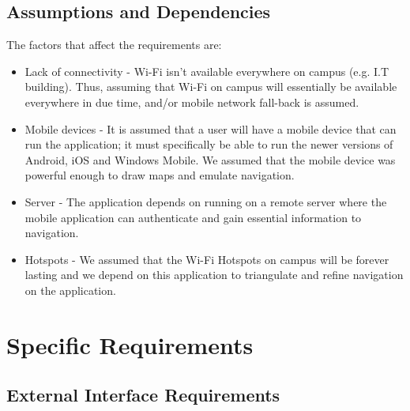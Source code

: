 \documentclass[runningheads,a4paper]{article}
\begin{document}
\subsection{Assumptions and Dependencies}

The factors that affect the requirements are:
\begin{itemize}
	 
		\item Lack of connectivity -  Wi-Fi isn't available everywhere on campus (e.g. I.T building). Thus, assuming that Wi-Fi on campus will essentially be available everywhere in due time, and/or mobile network fall-back is assumed.
		
		\item Mobile devices - It is assumed that a user will have a mobile device that can run the application; it must specifically be able to run the newer versions of Android, iOS and Windows Mobile. We assumed that the mobile device was powerful enough to draw maps and emulate navigation.
		\item Server - The application depends on running on a remote server where the mobile application can authenticate and gain essential information to navigation.
		
		\item Hotspots - We assumed that the Wi-Fi Hotspots on campus will be forever lasting and we depend on this application to triangulate and refine navigation on the application.
	 
\end{itemize}

\section{Specific Requirements}

\subsection{External Interface Requirements}
\end{document}
